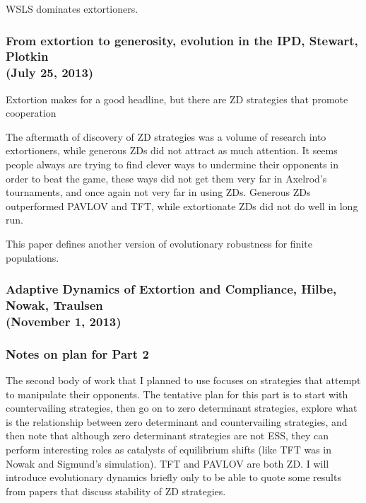 WSLS dominates extortioners. 


\subsubsection{From extortion to generosity, evolution in the IPD, Stewart, Plotkin \cite{Stewart03092013}
\\(July 25, 2013)}

Extortion makes for a good headline, but there are ZD strategies that promote cooperation 

The aftermath of discovery of ZD strategies was a volume of research into 
extortioners, while generous ZDs did not attract as much attention. It seems people always are trying to find clever ways to undermine their opponents in order to beat the game, these ways did not get them very far in Axelrod's tournaments, and once again not very far in using ZDs. Generous ZDs outperformed PAVLOV and TFT, while extortionate ZDs did not do well in long run.

This paper defines another version of evolutionary robustness for finite populations.


\subsubsection{Adaptive Dynamics of Extortion and Compliance, Hilbe, Nowak, Traulsen \cite{Hilbe_extortion_compliance}
\\(November 1, 2013)}


\subsubsection{Notes on plan for Part 2}
The second body of work that I planned to use focuses on strategies that attempt to manipulate their opponents. The tentative plan for this part is to start with countervailing strategies, then go on to zero determinant strategies, explore what is the relationship between zero determinant and countervailing strategies, and then note that although zero determinant strategies are not ESS, they can perform interesting roles as catalysts of equilibrium shifts (like TFT was in Nowak and Sigmund's simulation). TFT and PAVLOV are both ZD. I will introduce evolutionary dynamics briefly only to be able to quote some results from papers that discuss stability of ZD strategies.







